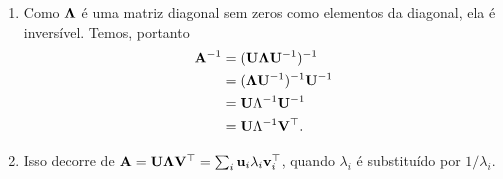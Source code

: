 \begin{exenumerate}
\begin{solution}
\begin{enumerate}
            \item[(iii)] Como $\mathbf{\Lambda}$ \'e uma matriz diagonal sem zeros como elementos da diagonal,
            ela \'e invers\'ivel. Temos, portanto
            \begin{align}
                \mathbf{A}^{-1} &= (\mathbf{U}\mathbf{\Lambda}{\mathbf{U}^{-1}})^{-1} \\
                & = (\mathbf{\Lambda} \mathbf{U}^{-1})^{-1}\mathbf{U}^{-1} \\
                &= \mathbf{U} \Lambda^{-1} \mathbf{U}^{-1} \\
                &= \mathbf{U}\Lambda^{-1}\mathbf{V}^\top.
            \end{align}
            
            \item[(iv)] Isso decorre de $\mathbf{A} = \mathbf{U} \mathbf{\Lambda} \mathbf{V}^\top = \sum_i \mathbf{u}_i \lambda_i \mathbf{v}_i^\top$, quando $\lambda_i$ \'e substitu\'ido por $1/\lambda_i$.
        \end{enumerate}
    \end{solution}  
\end{exenumerate}


